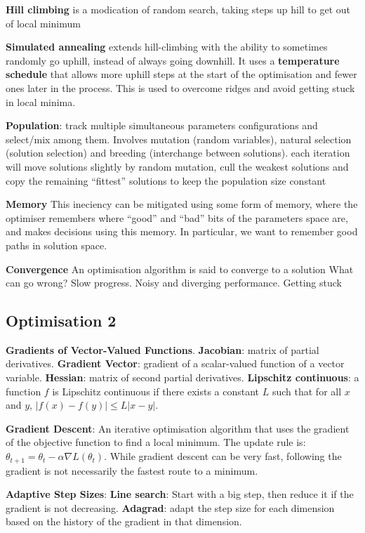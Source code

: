 \documentclass{article}
\begin{document}
\textbf{Hill climbing} is a modication of random search, taking steps up hill to get out of local minimum

\textbf{Simulated annealing} extends hill-climbing with the ability to sometimes randomly go
uphill, instead of always going downhill. It uses a \textbf{temperature schedule} that allows more
uphill steps at the start of the optimisation and fewer ones later in the process. This is used
to overcome ridges and avoid getting stuck in local minima.

\textbf{Population}: track multiple simultaneous parameters configurations and select/mix among them.
Involves mutation (random variables), natural selection (solution selection) and breeding (interchange between solutions).
each iteration will move solutions slightly by random mutation, cull the weakest solutions and copy the remaining “fittest” solutions to keep the population size constant

\textbf{Memory} This ineciency can be mitigated
using some form of memory, where the optimiser remembers where “good” and “bad” bits
of the parameters space are, and makes decisions using this memory. In particular, we want
to remember good paths in solution space.

\textbf{Convergence}
An optimisation algorithm is said to converge to a solution
What can go wrong? Slow progress. Noisy and diverging performance. Getting stuck



\subsection*{Optimisation 2}

\textbf{Gradients of Vector-Valued Functions}.
\textbf{Jacobian}: matrix of partial derivatives.
\textbf{Gradient Vector}: gradient of a scalar-valued function of a vector variable.
\textbf{Hessian}: matrix of second partial derivatives.
\textbf{Lipschitz continuous}: a function $f$ is Lipschitz continuous if there exists a constant $L$ such that for all $x$ and $y$, $|f(x) - f(y)| \leq L |x - y|$.

\textbf{Gradient Descent}: An iterative optimisation algorithm that uses the gradient of the objective function to find a local minimum. The update rule is:
$\theta_{t+1} = \theta_t - \alpha \nabla L(\theta_t)$. While gradient descent can be very fast, following the gradient is not necessarily the fastest route to a minimum.

\textbf{Adaptive Step Sizes}:
\textbf{Line search}: Start with a big step, then reduce it if the gradient is not decreasing.
\textbf{Adagrad}: adapt the step size for each dimension based on the history of the gradient in that dimension.
\end{document}
